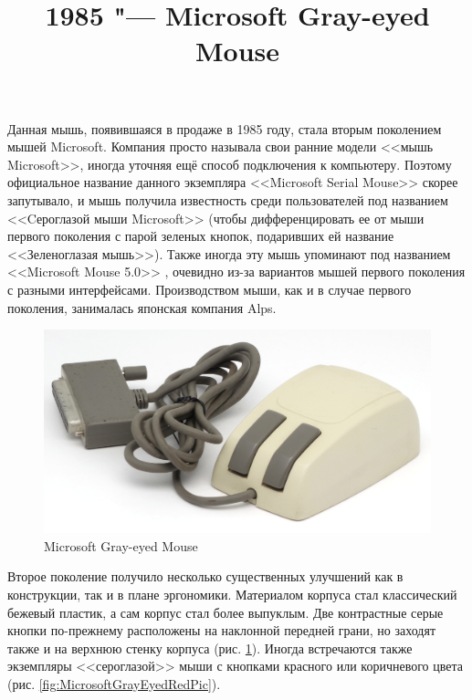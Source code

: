 \documentclass[11pt, a4paper]{article}
\begin{document}
\title{1985 "--- Microsoft Gray-eyed Mouse}
\date{}
\maketitle
{}

Данная мышь, появившаяся в продаже в 1985 году, стала вторым поколением мышей Microsoft. Компания просто называла свои ранние модели <<мышь Microsoft>>, иногда уточняя ещё способ подключения к компьютеру. Поэтому официальное название данного экземпляра <<Microsoft Serial Mouse>> скорее запутывало, и мышь получила известность среди пользователей под названием <<Cероглазой мыши Microsoft>> (чтобы дифференцировать ее от мыши первого поколения с парой зеленых кнопок, подаривших ей название <<Зеленоглазая мышь>>). Также иногда эту мышь упоминают под названием <<Microsoft Mouse 5.0>> \cite{mouses}, очевидно из-за вариантов мышей первого поколения с разными интерфейсами. Производством мыши, как и в случае первого поколения, занималась японская компания Alps.

\begin{figure}[h]
   \centering
    \includegraphics[scale=0.4]{1985_microsoft_gray_eyed_mouse/pic_30.jpg}
    \caption{Microsoft Gray-eyed Mouse}
    \label{fig:MicrosoftGrayEyedPic}
\end{figure}

Второе поколение получило несколько существенных улучшений как в конструкции, так и в плане эргономики. Материалом корпуса стал классический бежевый пластик, а сам корпус стал более выпуклым. Две контрастные серые кнопки по-прежнему расположены на наклонной передней грани, но заходят также и на верхнюю стенку корпуса (рис.  \ref{fig:MicrosoftGrayEyedPic}). Иногда встречаются также экземпляры <<сероглазой>> мыши с кнопками красного или коричневого цвета (рис.  \ref{fig:MicrosoftGrayEyedRedPic}).
\end{document}

